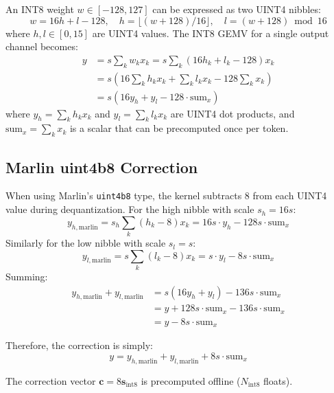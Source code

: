 \documentclass[11pt,a4paper]{article}
\begin{document}
An INT8 weight $w \in [-128, 127]$ can be expressed as two UINT4 nibbles:
\begin{equation}
    w = 16h + l - 128, \quad h = \lfloor (w + 128) / 16 \rfloor, \quad l = (w + 128) \bmod 16
\end{equation}
where $h, l \in [0, 15]$ are UINT4 values. The INT8 GEMV for a single output channel becomes:
\begin{align}
    y &= s \sum_k w_k x_k = s \sum_k (16h_k + l_k - 128) x_k \\
      &= s \left( 16 \sum_k h_k x_k + \sum_k l_k x_k - 128 \sum_k x_k \right) \\
      &= s (16 y_h + y_l - 128 \cdot \text{sum}_x)
\end{align}
where $y_h = \sum_k h_k x_k$ and $y_l = \sum_k l_k x_k$ are UINT4 dot products, and $\text{sum}_x = \sum_k x_k$ is a scalar that can be precomputed once per token.

\subsection{Marlin uint4b8 Correction}

When using Marlin's \texttt{uint4b8} type, the kernel subtracts 8 from each UINT4 value during dequantization. For the high nibble with scale $s_h = 16s$:
\begin{equation}
    y_{h,\text{marlin}} = s_h \sum_k (h_k - 8) x_k = 16s \cdot y_h - 128s \cdot \text{sum}_x
\end{equation}
Similarly for the low nibble with scale $s_l = s$:
\begin{equation}
    y_{l,\text{marlin}} = s \sum_k (l_k - 8) x_k = s \cdot y_l - 8s \cdot \text{sum}_x
\end{equation}
Summing:
\begin{align}
    y_{h,\text{marlin}} + y_{l,\text{marlin}} &= s(16y_h + y_l) - 136s \cdot \text{sum}_x \\
    &= y + 128s \cdot \text{sum}_x - 136s \cdot \text{sum}_x \\
    &= y - 8s \cdot \text{sum}_x
\end{align}

Therefore, the correction is simply:
\begin{equation}
\boxed{y = y_{h,\text{marlin}} + y_{l,\text{marlin}} + 8s \cdot \text{sum}_x}
\label{eq:correction}
\end{equation}

The correction vector $\mathbf{c} = 8\mathbf{s}_{\text{int8}}$ is precomputed offline ($N_{\text{int8}}$ floats).
\end{document}
